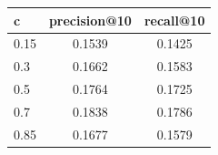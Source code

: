\begin{tabular}{lcc}
\toprule
c & precision@10 & recall@10 \\
\midrule
0.15 & 0.1539 & 0.1425 \\
0.3 & 0.1662 & 0.1583 \\
0.5 & 0.1764 & 0.1725 \\
0.7 & 0.1838 & 0.1786 \\
0.85 & 0.1677 & 0.1579 \\
\bottomrule
\end{tabular}
